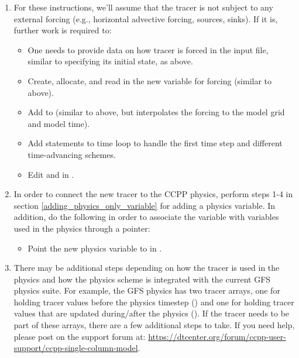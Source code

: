 \begin{enumerate}
\begin{itemize}
	\end{itemize}
\item For these instructions, we'll assume that the tracer is not subject to any external forcing (e.g., horizontal advective forcing, sources, sinks). If it is, further work is required to:
	\begin{itemize}
	\item One needs to provide data on how tracer is forced in the input file, similar to specifying its initial state, as above.
	\item Create, allocate, and read in the new variable for forcing (similar to above).
	\item Add to  (similar to above, but interpolates the forcing to the model grid and model time).
	\item Add statements to time loop to handle the first time step and different time-advancing schemes.
	\item Edit  and  in .
	\end{itemize}
\item In order to connect the new tracer to the CCPP physics, perform steps 1-4 in section \ref{adding_physics_only_variable} for adding a physics variable. In addition, do the following in order to associate the  variable with variables used in the physics through a pointer:
	\begin{itemize}
	\item Point the new physics variable to  in .
	\end{itemize}
\item There may be additional steps depending on how the tracer is used in the physics and how the physics scheme is integrated with the current GFS physics suite. For example, the GFS physics has two tracer arrays, one for holding tracer values before the physics timestep () and one for holding tracer values that are updated during/after the physics (). If the tracer needs to be part of these arrays, there are a few additional steps to take. If you need help, please post on the support forum at: \url{https://dtcenter.org/forum/ccpp-user-support/ccpp-single-column-model}.
\end{enumerate}
